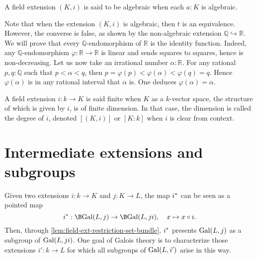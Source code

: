 \begin{definition}
  A field extension $(K,i)$ is said to be algebraic when each $a:K$ is algebraic.
  \label{defn:algebraic-extension}
\end{definition}

\begin{remark}
  Note that when the extension $(K,i)$ is algebraic, then $t$ is an
  equivalence. However, the converse is false, as shown by the non-algebraic
  extension $\mathbb Q \hookrightarrow \mathbb R$. We will prove that every
  $\mathbb Q$-endomorphism of $\mathbb R$ is the identity function. Indeed, any
  $\mathbb Q$-endomorphism $\varphi : \mathbb R \to \mathbb R$ is linear and
  sends squares to squares, hence is non-decreasing. Let us now take an irrational
  number $\alpha:\mathbb R$. For any rational $p,q:\mathbb Q$ such that $p <
  \alpha < q$, then $p = \varphi(p) < \varphi(\alpha) < \varphi(q) = q$. Hence
  $\varphi(\alpha)$ is in any rational interval that $\alpha$ is. One deduces
  $\varphi(\alpha) = \alpha$.
  \label{rem:algebraic-endomorphisms-are-automorphisms}
\end{remark}

\begin{definition}
  A field extension $i:k\to K$ is said finite when $K$ as a
  $k$-vector space, the structure of which is given by $i$, is of finite dimension.
  In that case, the dimension is called the degree of $i$, denoted $[(K,i)]$ or $[K:k]$ when $i$ is clear from context.
  \label{defn:degree-field-extension}
\end{definition} 

\section{Intermediate extensions and subgroups}
%
Given two extensions $i: k \to K$ and $j: K \to L$, the map ${{i}^\ast}$ can be seen as a pointed map
\begin{displaymath}
  \restr i: \B\Gal(L,j) \to \B\Gal(L,ji),\quad x\mapsto x\circ i.
\end{displaymath}
Then, through \cref{lem:field-ext-restriction-set-bundle}, ${{i}^\ast}$ presents
$\mathrm{Gal}(L,j)$ as a subgroup of $\mathrm{Gal}(L,ji)$. One goal of Galois theory is to
characterize those extensions $i':k \to L$ for which all subgroups of
$\mathrm{Gal}(L,i')$ arise in this way. 

